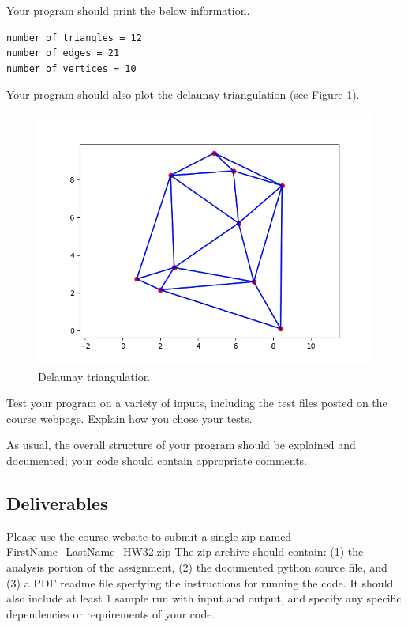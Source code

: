 \documentclass[11pt]{article}
\begin{document}
\begin{description}
Your program should print the below information.
\begin{lstlisting}
number of triangles = 12
number of edges = 21
number of vertices = 10
\end{lstlisting}

Your program should also plot the delaunay triangulation (see Figure \ref{fig:delaunay}).

\begin{figure}[H]
  \centering
  \includegraphics[scale=0.5]{points2.png}
  \caption{Delaunay triangulation}
  \label{fig:delaunay}
\end{figure}

Test your program on a variety of inputs, including the test files posted on the course webpage.
Explain how you chose your tests. 


As usual, the overall structure of your program should be explained and documented; your code should contain appropriate comments.
\end{description}
 
 

\subsection*{Deliverables}

Please use the course website to submit a single  zip  named   FirstName\_LastName\_HW32.zip
The zip archive should contain:  (1) the analysis portion of the assignment,  (2)  the documented python source file, and (3) a PDF readme file  specfying the instructions for running the code.  It should also include at least 1 sample run with input and output,  and specify any specific dependencies or requirements of your code.  
\end{document}
